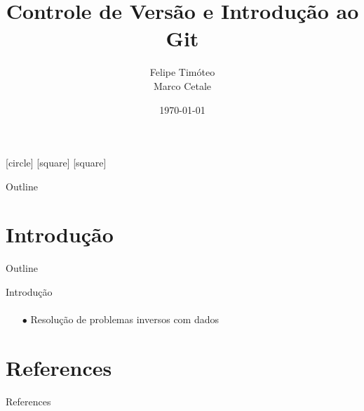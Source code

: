 \documentclass[xcolor=dvipsnames,t]{beamer}
\title[Git]{Controle de Versão e Introdução ao Git}
\author[Felipe]{Felipe Timóteo \\  Marco Cetale}
\institute{GISIS \& DOT UFF }
\date{\today}
\begin{document}
\begin{frame}
  \titlepage
\end{frame}

[circle]
[square]
[square]
\begin{frame}{Outline}
	\tiny
	\tableofcontents[pausesections]
\end{frame}

\section{Introdução}
\begin{frame}{Outline}
\tiny
\tableofcontents[current]
\end{frame}

\begin{frame}{Introdução}
\framesubtitle{}
\vfill	
\begin{itemize}
	\item[$ \bullet $] Resolução de problemas inversos com dados

\end{itemize}

\end{frame}

\section{References}
\begin{frame}[allowframebreaks]{References}
	\tiny
%	
\end{frame}
\end{document}
